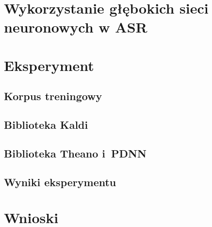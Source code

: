 \documentclass[a4paper]{report}
\theoremstyle{definition}
\begin{document}
\chapter{Wykorzystanie głębokich sieci neuronowych w ASR}

\chapter{Eksperyment}
\section{Korpus treningowy}
\section{Biblioteka Kaldi}
\section{Biblioteka Theano i~PDNN}
\section{Wyniki eksperymentu}

\chapter{Wnioski}
\end{document}
